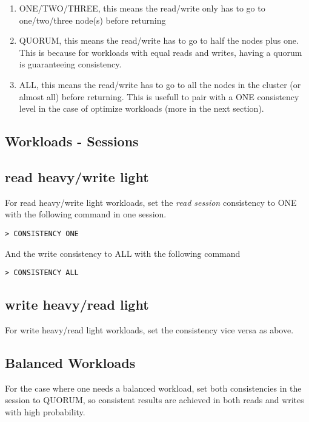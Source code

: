 \documentclass[9pt,twocolumn,twoside]{idsi}
\begin{document}
\begin{enumerate}
\item ONE/TWO/THREE, this means the read/write only has to go to one/two/three node(s) before returning
\item QUORUM, this means the read/write has to go to half the nodes plus one. This is because for workloads with equal reads and writes, having a quorum is guaranteeing consistency.
\item ALL, this means the read/write has to go to all the nodes in the cluster (or almost all) before returning. This is usefull to pair with a ONE consistency level in the case of optimize workloads (more in the next section).
\end{enumerate}

\subsection{Workloads - Sessions}

\subsection{read heavy/write light}

For read heavy/write light workloads, set the \textit{read session} consistency to ONE with the following command in one session.

\begin{lstlisting}[breaklines]
> CONSISTENCY ONE
\end{lstlisting}

And the write consistency to ALL with the following command

\begin{lstlisting}[breaklines]
> CONSISTENCY ALL
\end{lstlisting}

\subsection{write heavy/read light}

For write heavy/read light workloads, set the consistency vice versa as above. 

\subsection{Balanced Workloads}
For the case where one needs a balanced workload, set both consistencies in the session to QUORUM, so consistent results are achieved in both reads and writes with high probability.
\end{document}
